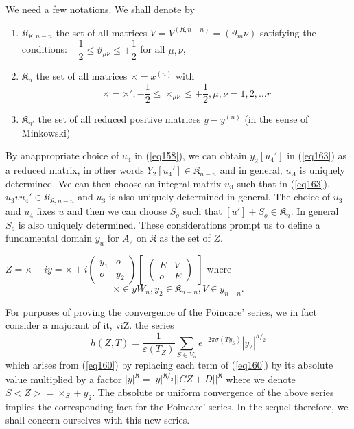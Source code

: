 We need a few notations. We shall denote by 
\begin{enumerate}[1)]
\item $\mathfrak{K}_{\mathfrak{K}, n-n} $ the set of all matrices $V =
  V^{(\mathfrak{K}, n - n)} = (\vartheta_m \nu)$ satisfying the
  conditions: $-\dfrac{1}{2} \leq \vartheta_{\mu \nu} \leq +
  \dfrac{1}{2}$ for all $\mu , \nu$,  

\item $\mathfrak{K}_n$ the set of all matrices $\times = x^{(n)}$ with  
$$
\times = \times ', - \frac{1}{2} \leq \times_{\mu \nu} \leq +
\frac{1}{2}, \mu , \nu = 1,2,\ldots r 
$$

\item $\mathfrak{K}_{n'}$ the set of all reduced positive matrices $y
- y^{(n)} $ (in the sense of Minkowski) 
\end{enumerate}

By an\pageoriginale appropriate choice of $u_4$ in (\ref{eq158}), we
can obtain $y_2 [ 
  u_4{'}]$ in (\ref{eq163}) as a reduced matrix, in other words $Y_2 [
  u_4{'}] \in \mathfrak{K}_{n-n}$ and in general, $u_{\Lambda}$ is
uniquely determined. We can then choose an integral matrix $u_3$ such
that in (\ref{eq163}), $u_3 v u_4{'} \in \mathfrak{K}_{\mathfrak{K}, n-n}$ and
$u_3$ is also uniquely determined in general. The choice of $u_3$ and
$u_4$ fixes $u$ and then we can choose $S_o$ such that $[ u' ] + S_o
\in \mathfrak{K}_n$. In general $S_o$ is also uniquely
determined. These considerations prompt us to define a fundamental
domain $y_u$ for $A_2$ on $\mathfrak{K}$ as the set of $Z$.  

$Z = \times + i y = \times + i \begin{pmatrix}y_1 & o \\ o &
  y_2 \end{pmatrix} \begin{bmatrix}\begin{pmatrix} E & V \\ o &
    E \end{pmatrix}\end{bmatrix}$ where  
\begin{equation*}
\times \in y W_n, y_2 \in \mathfrak{K}_{n-n}, V \in
y_{n-n}. \tag{164}\label{eq164} 
\end{equation*}

For purposes of proving the convergence of the Poincare' series, we in
fact consider a majorant of it, viZ. the series  
\begin{equation*}
h (Z, T) = \frac{1}{\varepsilon (T_Z)} \sum_{S \in V_n} e^{-2 \pi
  \sigma (T y_S) } | y_2 |^{h/_{2}} \tag{165}\label{eq165} 
\end{equation*}
which arises from (\ref{eq160}) by replacing each term of (\ref{eq160}) by its
absolute value multiplied by a factor $| y |^{\mathfrak{K}} = | y
|^{\mathfrak{K}/_{2}} || CZ + D ||^{\mathfrak{K}}$ where we denote $S <
Z > = \times_S + y_2$. The absolute or uniform convergence of the
above series implies the corresponding fact for the Poincare'
series. In the sequel therefore, we shall concern ourselves with this
new series.  

